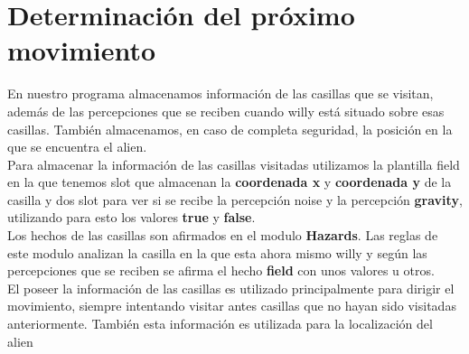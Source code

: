 \documentclass[a4paper,10pt]{article}
\begin{document}
\section{Determinación del próximo movimiento}
En nuestro programa almacenamos información de las casillas que se visitan, además de las percepciones que se reciben cuando willy está situado sobre esas casillas. También almacenamos, en caso de completa seguridad, la posición en la que se encuentra el alien.
\vspace{0.5 cm}\\
Para almacenar la información de las casillas visitadas utilizamos la plantilla field en la que tenemos slot que almacenan la {\bf coordenada x} y {\bf coordenada y}  de la casilla y dos slot para ver si se recibe la percepción noise y la percepción {\bf gravity}, utilizando para esto los valores {\bf true} y {\bf false}.
\vspace{0.5 cm}\\
Los hechos de las casillas son afirmados en el modulo {\bf Hazards}. Las reglas de este modulo analizan la casilla en la que esta ahora mismo willy y según las percepciones que se reciben se afirma el hecho {\bf field} con unos valores u otros.
\vspace{0.5 cm}\\
El poseer la información de las casillas es utilizado principalmente para dirigir el movimiento, siempre intentando visitar antes casillas que no hayan sido visitadas anteriormente. También esta información es utilizada para la localización del alien
\end{document}
